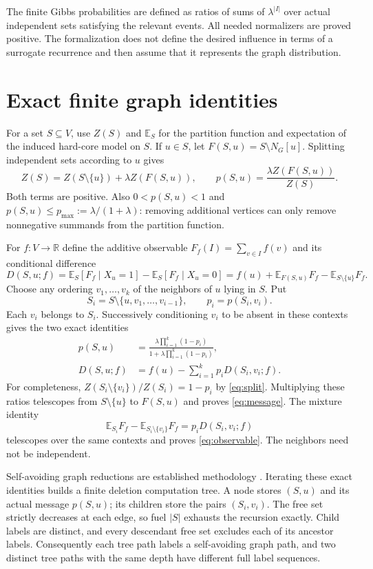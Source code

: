 \documentclass[11pt]{article}
\theoremstyle{definition}
\newcommand{\E}{\mathbb E}
\begin{document}
The finite Gibbs probabilities are defined as ratios of sums of
$\lambda^{|I|}$ over actual independent sets satisfying the relevant events.
All needed normalizers are proved positive. The formalization does not
define the desired influence in terms of a surrogate recurrence and then
assume that it represents the graph distribution.

\section{Exact finite graph identities}

For a set $S\subseteq V$, use $Z(S)$ and $\E_S$ for the partition function
and expectation of the induced hard-core model on $S$. If $u\in S$, let
$F(S,u)=S\setminus N_G[u]$. Splitting independent sets according to $u$
gives
\begin{equation}\label{eq:split}
 Z(S)=Z(S\setminus\{u\})+\lambda Z(F(S,u)),\qquad
 p(S,u)=\frac{\lambda Z(F(S,u))}{Z(S)}.
\end{equation}
Both terms are positive. Also $0<p(S,u)<1$ and
$p(S,u)\le p_{\max}:=\lambda/(1+\lambda)$: removing additional vertices
can only remove nonnegative summands from the partition function.

For $f:V\to\mathbb R$ define the additive observable
$F_f(I)=\sum_{v\in I}f(v)$ and its conditional difference
\[
 D(S,u;f)=\E_S[F_f\mid X_u=1]-\E_S[F_f\mid X_u=0]
 =f(u)+\E_{F(S,u)}F_f-\E_{S\setminus\{u\}}F_f.
\]
Choose any ordering $v_1,\ldots,v_k$ of the neighbors of $u$ lying in $S$.
Put
\[
 S_i=S\setminus\{u,v_1,\ldots,v_{i-1}\},\qquad
 p_i=p(S_i,v_i).
\]
Each $v_i$ belongs to $S_i$. Successively conditioning $v_i$ to be absent
in these contexts gives the two exact identities
\begin{align}
 p(S,u)&=\frac{\lambda\prod_{i=1}^k(1-p_i)}
                    {1+\lambda\prod_{i=1}^k(1-p_i)},\label{eq:message}\\
 D(S,u;f)&=f(u)-\sum_{i=1}^k p_iD(S_i,v_i;f).\label{eq:observable}
\end{align}
For completeness, $Z(S_i\setminus\{v_i\})/Z(S_i)=1-p_i$ by
\eqref{eq:split}. Multiplying these ratios telescopes from
$S\setminus\{u\}$ to $F(S,u)$ and proves \eqref{eq:message}.
The mixture identity
\[
 \E_{S_i}F_f-\E_{S_i\setminus\{v_i\}}F_f
 =p_i D(S_i,v_i;f)
\]
telescopes over the same contexts and proves \eqref{eq:observable}.
The neighbors need not be independent.

Self-avoiding graph reductions are established methodology \cite{Weitz}.
Iterating these exact identities builds a finite deletion computation tree.
A node stores $(S,u)$ and its actual message $p(S,u)$; its children store
the pairs $(S_i,v_i)$. The free set strictly decreases at each edge, so
fuel $|S|$ exhausts the recursion exactly. Child labels are distinct, and
every descendant free set excludes each of its ancestor labels. Consequently
each tree path labels a self-avoiding graph path, and two distinct tree paths
with the same depth have different full label sequences.
\end{document}
